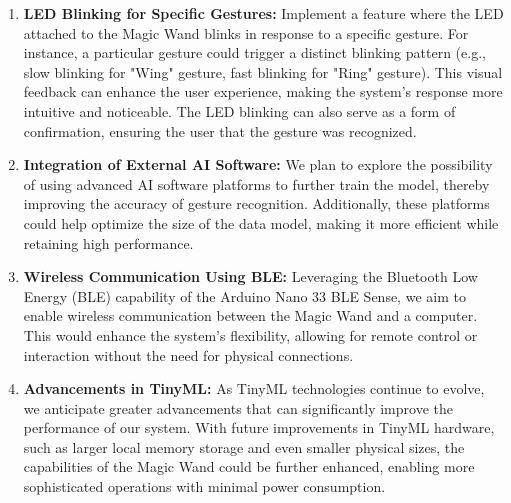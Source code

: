 \begin{enumerate}
	\item \textbf{LED Blinking for Specific Gestures:} 
	Implement a feature where the LED attached to the Magic Wand blinks in response to a specific gesture. For instance, a particular gesture could trigger a distinct blinking pattern (e.g., slow blinking for "Wing" gesture, fast blinking for "Ring" gesture). This visual feedback can enhance the user experience, making the system's response more intuitive and noticeable. The LED blinking can also serve as a form of confirmation, ensuring the user that the gesture was recognized.
	
	\item \textbf{Integration of External AI Software:} 
	We plan to explore the possibility of using advanced AI software platforms to further train the model, thereby improving the accuracy of gesture recognition. Additionally, these platforms could help optimize the size of the data model, making it more efficient while retaining high performance.
	
	\item \textbf{Wireless Communication Using BLE:} 
	Leveraging the Bluetooth Low Energy (BLE) capability of the Arduino Nano 33 BLE Sense, we aim to enable wireless communication between the Magic Wand and a computer. This would enhance the system's flexibility, allowing for remote control or interaction without the need for physical connections.
	
	\item \textbf{Advancements in TinyML:} 
	As TinyML technologies continue to evolve, we anticipate greater advancements that can significantly improve the performance of our system. With future improvements in TinyML hardware, such as larger local memory storage and even smaller physical sizes, the capabilities of the Magic Wand could be further enhanced, enabling more sophisticated operations with minimal power consumption.
\end{enumerate}
